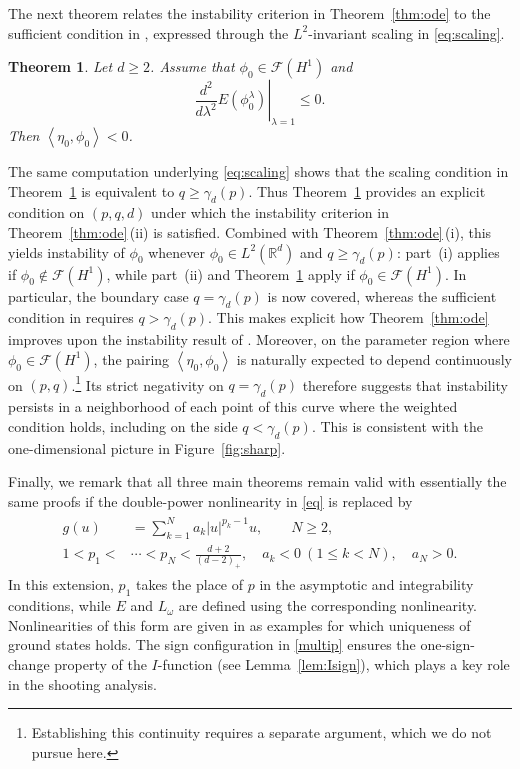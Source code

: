 \documentclass[12pt, a4paper, reqno]{amsart}
\numberwithin{equation}{section}
\newtheorem{theorem}{Theorem}[section]
\theoremstyle{definition}
\theoremstyle{remark}
\newcommand{\R}{\mathbb R}
\newcommand{\cF}{\mathcal F}
\def\tbra[#1,#2]{{\left\langle #1,#2\right\rangle}}
\begin{document}
The next theorem relates the instability criterion in
Theorem~\ref{thm:ode} to the sufficient condition in \cite{FH21},
expressed through the $L^2$-invariant scaling in \eqref{eq:scaling}.

\begin{theorem}\label{thm:scale}
Let $d\ge2$. Assume that $\phi_0\in \cF(H^1)$ and
\[
  \left.\frac{d^2}{d\lambda^2}E(\phi_0^\lambda)\right|_{\lambda=1}
  \le 0.
\]
Then $\tbra[\eta_0,\phi_0]<0$.
\end{theorem}

The same computation underlying \eqref{eq:scaling} shows
that the scaling condition in Theorem~\ref{thm:scale} is equivalent to $q\ge\gamma_d(p)$.
Thus Theorem~\ref{thm:scale} provides an explicit condition on $(p,q,d)$ under which the instability criterion in Theorem~\ref{thm:ode}\,\textup{(ii)} is satisfied. Combined with Theorem~\ref{thm:ode}\,\textup{(i)}, this yields instability of $\phi_0$ whenever $\phi_0\in L^2(\R^d)$ and $q\ge\gamma_d(p)$: part~\textup{(i)} applies if $\phi_0\notin\cF(H^1)$, while part~\textup{(ii)} and Theorem~\ref{thm:scale} apply if $\phi_0\in\cF(H^1)$. In particular, the boundary case $q=\gamma_d(p)$ is now covered, whereas the sufficient condition in \cite{FH21} requires $q>\gamma_d(p)$. This makes explicit how Theorem~\ref{thm:ode} improves upon the instability result of \cite{FH21}.
Moreover, on the parameter region where $\phi_0\in\cF(H^1)$,
the pairing $\tbra[\eta_0,\phi_0]$ is naturally expected to depend continuously
on $(p,q)$.\footnote{Establishing this continuity requires a separate
argument, which we do not pursue here.}
Its strict negativity on $q=\gamma_d(p)$ therefore suggests that
instability persists in a neighborhood of each point of this curve
where the weighted condition holds, including on the side
$q<\gamma_d(p)$.
This is consistent with the one-dimensional picture in
Figure~\ref{fig:sharp}.

Finally, we remark that all three main theorems remain valid with essentially the same proofs if the double-power nonlinearity in \eqref{eq} is replaced by
\begin{align}
\label{multip}
\begin{aligned}
g(u)&=\sum_{k=1}^N a_k|u|^{p_k-1}u,
\qquad N\ge2,
\\
1<p_1<&\cdots<p_N<\frac{d+2}{(d-2)_+},
\quad a_k<0~(1\le k<N),
\quad a_N>0.
\end{aligned}
\end{align}
In this extension, $p_1$ takes the place of $p$ in the asymptotic and integrability conditions, while $E$ and $L_\omega$ are defined using the corresponding nonlinearity. Nonlinearities of this form are given in \cite{KZ91,M93} as examples for which uniqueness of ground states holds. The sign configuration
in \eqref{multip} ensures the one-sign-change property of the
$I$-function (see Lemma~\ref{lem:Isign}), which plays a key role
in the shooting analysis.
\end{document}
